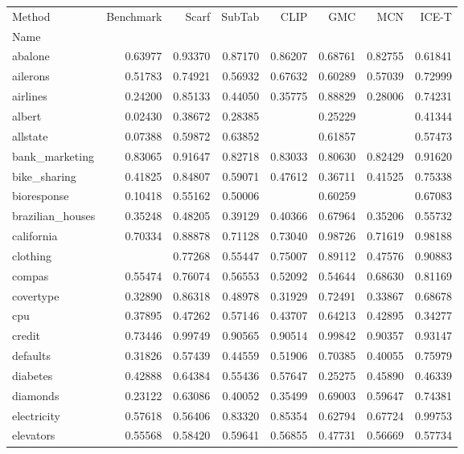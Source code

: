 \begin{tabular}{lrrrrrrr}
\toprule
Method & Benchmark & Scarf & SubTab & CLIP & GMC & MCN & ICE-T \\
Name &  &  &  &  &  &  &  \\
\midrule
abalone & 0.63977 & 0.93370 & 0.87170 & 0.86207 & 0.68761 & 0.82755 & 0.61841 \\
ailerons & 0.51783 & 0.74921 & 0.56932 & 0.67632 & 0.60289 & 0.57039 & 0.72999 \\
airlines & 0.24200 & 0.85133 & 0.44050 & 0.35775 & 0.88829 & 0.28006 & 0.74231 \\
albert & 0.02430 & 0.38672 & 0.28385 &  & 0.25229 &  & 0.41344 \\
allstate & 0.07388 & 0.59872 & 0.63852 &  & 0.61857 &  & 0.57473 \\
bank_marketing & 0.83065 & 0.91647 & 0.82718 & 0.83033 & 0.80630 & 0.82429 & 0.91620 \\
bike_sharing & 0.41825 & 0.84807 & 0.59071 & 0.47612 & 0.36711 & 0.41525 & 0.75338 \\
bioresponse & 0.10418 & 0.55162 & 0.50006 &  & 0.60259 &  & 0.67083 \\
brazilian_houses & 0.35248 & 0.48205 & 0.39129 & 0.40366 & 0.67964 & 0.35206 & 0.55732 \\
california & 0.70334 & 0.88878 & 0.71128 & 0.73040 & 0.98726 & 0.71619 & 0.98188 \\
clothing &  & 0.77268 & 0.55447 & 0.75007 & 0.89112 & 0.47576 & 0.90883 \\
compas & 0.55474 & 0.76074 & 0.56553 & 0.52092 & 0.54644 & 0.68630 & 0.81169 \\
covertype & 0.32890 & 0.86318 & 0.48978 & 0.31929 & 0.72491 & 0.33867 & 0.68678 \\
cpu & 0.37895 & 0.47262 & 0.57146 & 0.43707 & 0.64213 & 0.42895 & 0.34277 \\
credit & 0.73446 & 0.99749 & 0.90565 & 0.90514 & 0.99842 & 0.90357 & 0.93147 \\
defaults & 0.31826 & 0.57439 & 0.44559 & 0.51906 & 0.70385 & 0.40055 & 0.75979 \\
diabetes & 0.42888 & 0.64384 & 0.55436 & 0.57647 & 0.25275 & 0.45890 & 0.46339 \\
diamonds & 0.23122 & 0.63086 & 0.40052 & 0.35499 & 0.69003 & 0.59647 & 0.74381 \\
electricity & 0.57618 & 0.56406 & 0.83320 & 0.85354 & 0.62794 & 0.67724 & 0.99753 \\
elevators & 0.55568 & 0.58420 & 0.59641 & 0.56855 & 0.47731 & 0.56669 & 0.57734 \\

\end{tabular}
